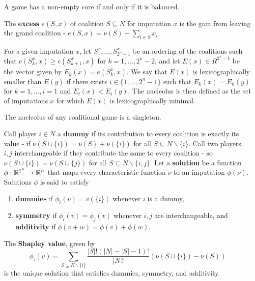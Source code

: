 \begin{thm}
  \label{sec:cooperative-games-3}
  A game has a non-empty core if and only if it is balanced.
\end{thm}



\begin{defn}
  \label{sec:cooperative-games-5}
  The \textbf{excess} $e(S, x)$ of coalition $S \subseteq N$ for
  imputation $x$ is the gain from leaving the grand coalition - $e(S,
  x) = \nu(S) - \sum_{i \in S}^{} x_{i}$.

  For a given imputation $x$, let $S_{1}^{x}, \dots, S_{2^{n}-1}^{x}$
  be an ordering of the coalitions such that $e(S^{x}_{k}, x) \geq
  e(S_{k+1}^{x}, x)$ for $k = 1, \dots, 2^{n} - 2$, and let $E(x) \in
  R^{2^{n} - 1}$ be the vector given by $E_{k}(x) = e(S_{k}^{x}, x)$.
  We say that $E(x)$ is lexicographically smaller than $E(y)$ if there
  exists $i \in \{ 1, \dots, 2^{n} - 1 \} $ such that $E_{k}(x) =
  E_{k}(y)$ for $k = 1, \dots, i=1$ and $E_{i} (x) < E_{i}(y)$. The
  nucleolus is then defined as the set of imputations $x$ for which
  $E(x)$ is lexicographically minimal.
\end{defn}

\begin{thm}
  \label{sec:cooperative-games-6}
  The nucleolus of any coalitional game is a singleton.
\end{thm}

\begin{defn}
  \label{sec:cooperative-games-7}
  Call player $i \in N$ a \textbf{dummy} if its contribution to every
  coalition is exactly its value - if $\nu(S \cup \{ i \} ) = \nu(S) +
  \nu(\{ i \} )$ for all $S \subseteq N \backslash \{ i \} $. Call two
  players $i, j$ interchangeable if they contribute the same to every
  coalition - so $\nu(S \cup \{ i \} ) = \nu(S \cup \{ j \} )$ for all
  $S \subseteq N \backslash \{ i, j \} $. Let a \textbf{solution} be a
  function $\phi: \mathbb{R}^{2^{n}} \rightarrow \mathbb{R}^{n}$ that maps every
  characteristic function $\nu$ to an imputation $\phi(\nu)$.
  Solutions $\phi$ is said to satisfy
  \begin{enumerate}
  \item \textbf{dummies} if $\phi_{i}(v) = v(\{ i \} )$ whenever $i$
    is a dummy,
  \item \textbf{symmetry} if $\phi_{i}(v) = \phi_{j}(v)$ whenever $i,
    j$ are interchangeable, and \textbf{additivity} if $\phi(v + w) =
    \phi(v) + \phi(w)$.
  \end{enumerate}
\end{defn}
\begin{thm}
  \label{sec:cooperative-games-8}
  The \textbf{Shapley value}, given by
  \begin{equation}
    \label{eq:21}
    \phi_{i}(v) = \sum_{S \subseteq N \backslash \{ i \} }^{}
    \frac{|S|!(|N| - |S| - 1)!}{|N|!} (\nu(S \cup \{ i \} ) - \nu(S))
  \end{equation} is the unique solution that satisfies dummies,
  symmetry, and additivity.
\end{thm}

